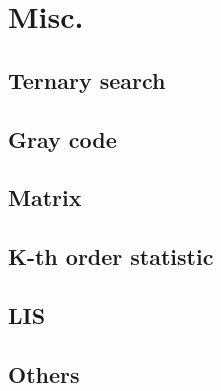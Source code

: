 \section{Misc.}

\subsection{Ternary search}

\subsection{Gray code}

\subsection{Matrix}

\subsection{K-th order statistic}

\subsection{LIS}

\subsection{Others}
  
